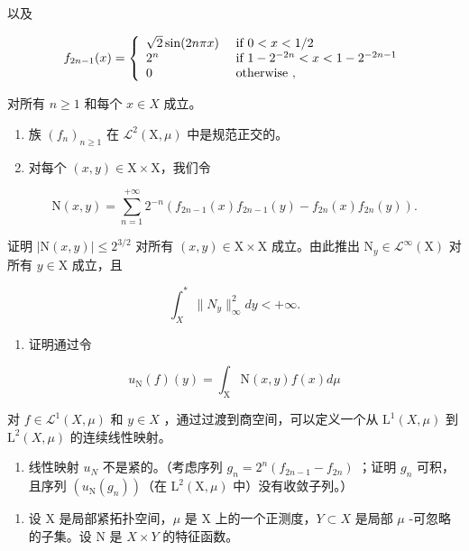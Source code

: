 以及

\[
f _ {2 n - 1} (x) = \left\{ \begin{array}{l l} \sqrt {2} \sin (2 n \pi x) & \text { if } 0 <   x <   1 / 2 \\ 2 ^ {n} & \text { if } 1 - 2 ^ {- 2 n} <   x <   1 - 2 ^ {- 2 n - 1} \\ 0 & \text { otherwise }, \end{array} \right.
\]

对所有 \(n \geqslant 1\) 和每个 \(x \in X\) 成立。

\begin{enumerate}
\def\labelenumi{\alph{enumi})}
\item
  族 \((f_n)_{n\geqslant 1}\) 在 \(\mathcal{L}^2 (\mathrm{X},\mu)\) 中是规范正交的。
\item
  对每个 \((x,y)\in \mathrm{X}\times \mathrm{X}\)，我们令
\end{enumerate}

\[
\mathrm{N} (x, y) = \sum_ {n = 1} ^ {+ \infty} 2 ^ {- n} (f _ {2 n - 1} (x) f _ {2 n - 1} (y) - f _ {2 n} (x) f _ {2 n} (y)).
\]

证明 \(|\mathrm{N}(x,y)| \leqslant 2^{3/2}\) 对所有 \((x,y) \in \mathrm{X} \times \mathrm{X}\) 成立。由此推出 \(\mathrm{N}_y \in \mathcal{L}^\infty(\mathrm{X})\) 对所有 \(y \in \mathrm{X}\) 成立，且

\[
\int_ {X} ^ {*} \| N _ {y} \| _ {\infty} ^ {2} d y <   + \infty .
\]

\begin{enumerate}
\def\labelenumi{\alph{enumi})}
\setcounter{enumi}{2}
\tightlist
\item
  证明通过令
\end{enumerate}

\[
u _ {\mathrm{N}} (f) (y) = \int_ {\mathrm{X}} \mathrm{N} (x, y) f (x) d \mu
\]

对 \(f \in \mathcal{L}^{1}(X, \mu)\) 和 \(y \in X\) ，通过过渡到商空间，可以定义一个从 \(\mathrm{L}^{1}(X, \mu)\) 到 \(\mathrm{L}^{2}(X, \mu)\) 的连续线性映射。

\begin{enumerate}
\def\labelenumi{\alph{enumi})}
\setcounter{enumi}{3}
\tightlist
\item
  线性映射 \(u_{N}\) 不是紧的。（考虑序列 \(g_{n}=2^{n}(f_{2n-1}-f_{2n})\) ；证明 \(g_{n}\) 可积，且序列 \((u_{\mathrm{N}}(g_{n}))\)（在 \(\mathrm{L}^{2}(\mathrm{X},\mu)\) 中）没有收敛子列。）
\end{enumerate}

\begin{enumerate}
\def\labelenumi{\arabic{enumi})}
\setcounter{enumi}{2}
\tightlist
\item
  设 X 是局部紧拓扑空间，\(\mu\) 是 X 上的一个正测度，\(Y \subset X\) 是局部 \(\mu\) -可忽略的子集。设 N 是 \(X \times Y\) 的特征函数。
\end{enumerate}

